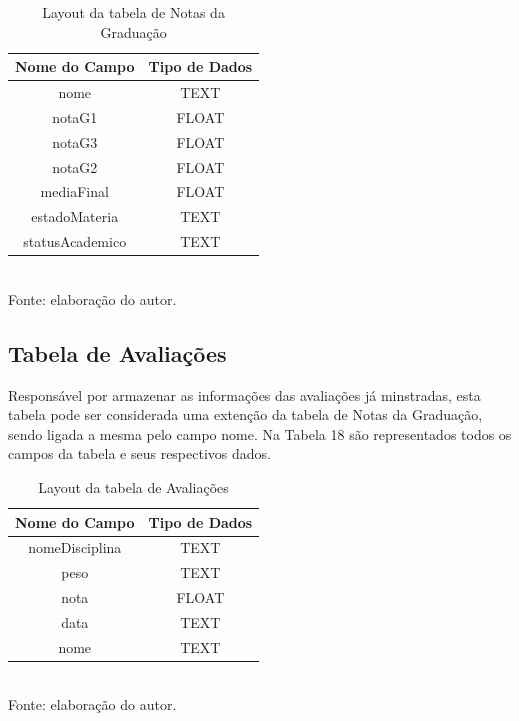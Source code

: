 \begin{table}[!hbt]
\centering
\caption[Aplicação - Tabela de Notas da Graduação]{Layout da tabela de Notas da Graduação}
\vspace{3mm}
\begin{tabular}{c|c}\hline
\textbf{Nome do Campo} & \textbf{Tipo de Dados} \\ \hline
nome                   & TEXT                   \\ \hline
notaG1                 & FLOAT                  \\ \hline
notaG3                 & FLOAT                  \\ \hline
notaG2                 & FLOAT                  \\ \hline
mediaFinal             & FLOAT                  \\ \hline
estadoMateria          & TEXT                   \\ \hline
statusAcademico        & TEXT                   \\ \hline
\end{tabular}
\\ Fonte: elaboração do autor.
\end{table}

\subsection{Tabela de Avaliações}
Responsável por armazenar as informações das avaliações já minstradas, esta tabela pode ser considerada uma extenção da tabela de Notas da Graduação, sendo ligada a mesma pelo campo nome. Na Tabela 18 são representados todos os campos da tabela e seus respectivos dados.
    
\begin{table}[!hbt]
\centering
\caption[Aplicação - Tabela de Avaliações]{Layout da tabela de Avaliações}
\vspace{3mm}
\begin{tabular}{c|c}\hline
\textbf{Nome do Campo} & \textbf{Tipo de Dados} \\ \hline
nomeDisciplina         & TEXT                   \\ \hline
peso                   & TEXT                   \\ \hline
nota                   & FLOAT                  \\ \hline
data                   & TEXT                   \\ \hline 
nome                   & TEXT                   \\ \hline
\end{tabular}
\\ Fonte: elaboração do autor.
\end{table}

